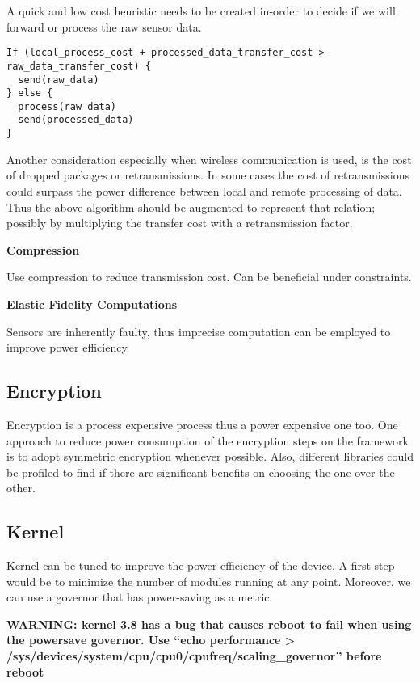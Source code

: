 A quick and low cost heuristic needs to be created in-order to decide if we will forward or process the raw sensor data.

\begin{lstlisting}
If (local_process_cost + processed_data_transfer_cost > raw_data_transfer_cost) {
  send(raw_data)
} else {
  process(raw_data)
  send(processed_data)
}
\end{lstlisting}

Another consideration especially when wireless communication is used, is the cost of dropped packages or retransmissions. In some cases the cost of retransmissions could surpass the power difference between local and remote processing of data. Thus the above algorithm should be augmented to represent that relation; possibly by multiplying the transfer cost with a retransmission factor.

\noindent
\textbf{Compression}

Use compression to reduce transmission cost. Can be beneficial under constraints.

\noindent
\textbf{Elastic Fidelity Computations}

Sensors are inherently faulty, thus imprecise computation can be employed to improve power efficiency


\subsection{Encryption}

Encryption is a process expensive process thus a power expensive one too. One approach to reduce power consumption of the encryption steps on the framework is to adopt symmetric encryption whenever possible. Also, different libraries could be profiled to find if there are significant benefits on choosing the one over the other.

\subsection{Kernel}

Kernel can be tuned to improve the power efficiency of the device. A first step would be to minimize the number of modules running at any point. Moreover, we can use a governor that has power-saving as a metric.

\textbf{WARNING: kernel 3.8 has a bug that causes reboot to fail when using the powersave governor. Use ``echo performance > /sys/devices/system/cpu/cpu0/cpufreq/scaling\_governor'' before reboot}


